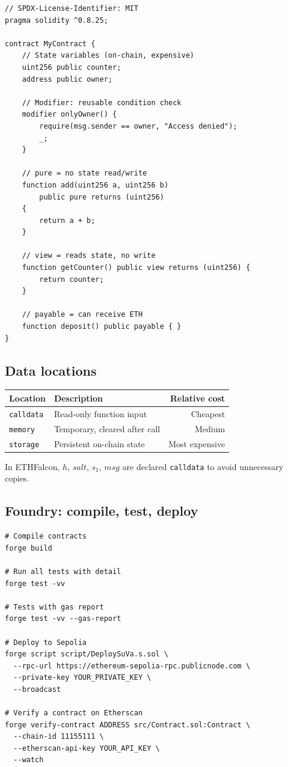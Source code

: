 \documentclass[11pt,a4paper]{article}
\begin{document}
\begin{lstlisting}[style=solidity, caption={Key Solidity elements}]
// SPDX-License-Identifier: MIT
pragma solidity ^0.8.25;

contract MyContract {
    // State variables (on-chain, expensive)
    uint256 public counter;
    address public owner;

    // Modifier: reusable condition check
    modifier onlyOwner() {
        require(msg.sender == owner, "Access denied");
        _;
    }

    // pure = no state read/write
    function add(uint256 a, uint256 b)
        public pure returns (uint256)
    {
        return a + b;
    }

    // view = reads state, no write
    function getCounter() public view returns (uint256) {
        return counter;
    }

    // payable = can receive ETH
    function deposit() public payable { }
}
\end{lstlisting}

\subsection{Data locations}

\begin{center}
\begin{tabular}{llr}
\toprule
\textbf{Location} & \textbf{Description} & \textbf{Relative cost} \\
\midrule
\texttt{calldata} & Read-only function input & Cheapest \\
\texttt{memory}   & Temporary, cleared after call & Medium \\
\texttt{storage}  & Persistent on-chain state & Most expensive \\
\bottomrule
\end{tabular}
\end{center}

In ETHFalcon, $h$, $salt$, $s_1$, $msg$ are declared \texttt{calldata} to avoid unnecessary copies.

\subsection{Foundry: compile, test, deploy}

\begin{lstlisting}[style=bash]
# Compile contracts
forge build

# Run all tests with detail
forge test -vv

# Tests with gas report
forge test -vv --gas-report

# Deploy to Sepolia
forge script script/DeploySuVa.s.sol \
  --rpc-url https://ethereum-sepolia-rpc.publicnode.com \
  --private-key YOUR_PRIVATE_KEY \
  --broadcast

# Verify a contract on Etherscan
forge verify-contract ADDRESS src/Contract.sol:Contract \
  --chain-id 11155111 \
  --etherscan-api-key YOUR_API_KEY \
  --watch
\end{lstlisting}
\end{document}
